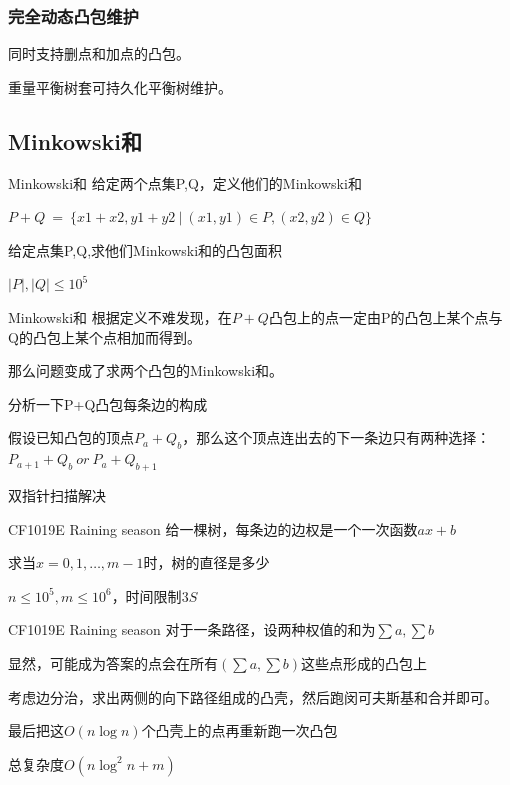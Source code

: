 \begin{frame}
\frametitle{完全动态凸包维护}
\pause
同时支持删点和加点的凸包。

\pause
重量平衡树套可持久化平衡树维护。
\end{frame}

\subsection{Minkowski和}
\begin{frame}{Minkowski和}
给定两个点集P,Q，定义他们的Minkowski和

$P+Q \ = \ \{x1+x2,y1+y2 \ | \ (x1,y1) \in P,(x2,y2) \in Q\}$ \newline \newline

\pause
给定点集P,Q,求他们Minkowski和的凸包面积

$|P|,|Q| \le 10^5$
\end{frame}

\begin{frame}{Minkowski和}
\pause
根据定义不难发现，在$P+Q$凸包上的点一定由P的凸包上某个点与Q的凸包上某个点相加而得到。

那么问题变成了求两个凸包的Minkowski和。 \newline \newline

\pause
分析一下P+Q凸包每条边的构成

假设已知凸包的顶点$P_a+Q_b$，那么这个顶点连出去的下一条边只有两种选择：$P_{a+1}+Q_b \ or \ P_a+Q_{b+1}$ \newline \newline

\pause
双指针扫描解决
\end{frame}

\begin{frame}{CF1019E Raining season}
    给一棵树，每条边的边权是一个一次函数$ax+b$

    求当$x=0,1,\ldots,m-1$时，树的直径是多少

    $n \le 10^5, m \le 10^6$，时间限制$3S$
\end{frame}

\begin{frame}{CF1019E Raining season}
    对于一条路径，设两种权值的和为$\sum a, \sum b$

    显然，可能成为答案的点会在所有$(\sum a, \sum b)$这些点形成的凸包上

    考虑边分治，求出两侧的向下路径组成的凸壳，然后跑闵可夫斯基和合并即可。

    最后把这$O(n\log n)$个凸壳上的点再重新跑一次凸包

    总复杂度$O(n \log^2 n + m)$

\end{frame}